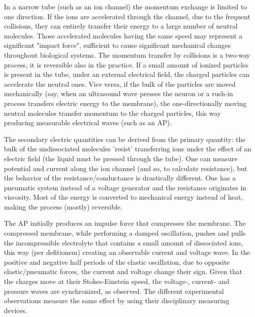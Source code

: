 \fi


\ifx\magyar\undefined
In a narrow tube (such as an ion channel) the momentum exchange
is limited to one direction.
If the ions are accelerated through the channel, due  to the
frequent collisions, they can entirely transfer their 
energy to a large number of neutral molecules. 
Those accelerated molecules having the same speed
may represent a significant "impact force", sufficient
to cause significant mechanical changes throughout
biological systems.
The momentum transfer by collisions
is a two-way process, it is reversible also in the practice. If a small amount of ionized
particles is present in the tube, under an external electrical
field, the charged particles can accelerate the neutral ones.
Vice versa, if the bulk of the particles are moved mechanically (say, when an ultrasound wave
presses the neuron or a rush-in process transfers electric energy to the membrane), the one-directionally moving
neutral molecules transfer momentum to the charged particles,
this way producing measurable electrical waves (such as an \gls{AP}).
\else

\fi



\ifx\magyar\undefined
The secondary electric quantities can be derived from
the primary quantity: the bulk of the undissociated molecules
'resist' transferring ions under the effect of an electric field (the liquid must be pressed through the tube).
One can measure potential and current along the ion
channel (and so, to calculate resistance), but the behavior of the resistance/conductance is 
drastically different. One has a pneumatic system instead of a voltage generator and the resistance originates in viscosity. Most of the energy is converted to
mechanical energy instead of heat, making the process (mostly) reversible.


The \gls{AP} initially produces an impulse force that compresses the membrane. The compressed membrane, while performing a damped oscillation, pushes and pulls the incompressible electrolyte that contains a small amount of dissociated ions, this way (per defitionem)
creating an observable current and voltage wave. In the 
positive and negative half periods of the elastic oscillation,
due to opposite elastic/pneumatic forces, the current and voltage  change their sign. Given that the charges move at their
Stokes-Einstein speed, the voltage-, current- and pressure waves are synchronized, as observed. The different 
experimental observations measure the same effect
by using their disciplinary measuring devices.
\else

